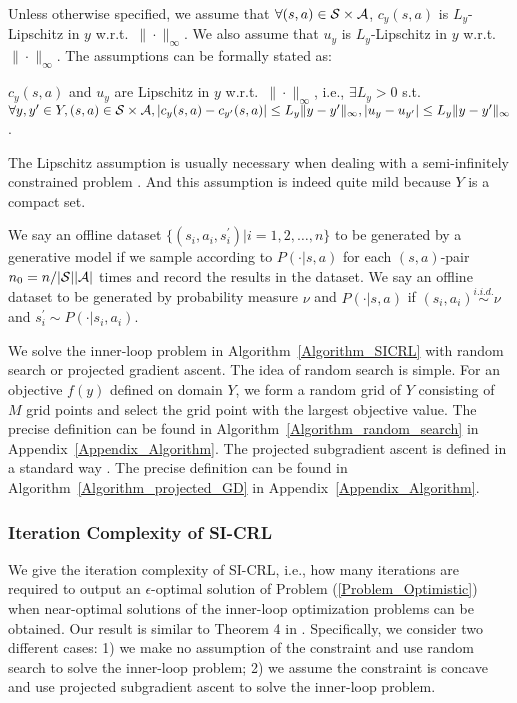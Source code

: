 Unless otherwise specified, we assume that $\forall (s,a)\in {\mathcal{S}}\times {\mathcal{A}}$, $c_y(s,a)$ is $L_y$-Lipschitz in $y$ w.r.t.\ $\|\cdot\|_\infty$.
We also assume that $u_y$ is $L_y$-Lipschitz in $y$ w.r.t.\ $\|\cdot\|_\infty$.
The assumptions can be formally stated as:
\begin{assumption}\label{Assumption_Lipschitz}
$c_y(s,a)$ and $u_y$ are Lipschitz in $y$ w.r.t.\ $\|\cdot\|_\infty$, i.e., $\exists L_y>0$ s.t. $\forall y,y^\prime\in Y, (s,a)\in {\mathcal{S}}\times {\mathcal{A}}, |c_y(s,a)-c_{y^\prime}(s,a)|\leq L_y\|y-y^\prime\|_\infty, 
|u_y-u_{y^\prime}|\leq L_y\|y-y^\prime\|_\infty$.
\end{assumption}
The Lipschitz assumption is usually necessary when dealing with a semi-infinitely constrained problem \citep{still2001discretization,Hu1990}.
And this assumption is indeed quite mild because $Y$ is a compact set.

We say an offline dataset $\{(s_i,a_i,s_i^\prime)|i=1, 2, \ldots, n\}$ to be generated by a generative model if we sample according to $P(\cdot|s,a)$ for each $(s,a)$-pair $n_0=n/|{\mathcal{S}}||{\mathcal{A}}|$ times and record the results in the dataset.
We say an offline dataset to be generated by probability measure $\nu$ and $P(\cdot|s,a)$ if $(s_i,a_i)\stackrel{i.i.d.}{\sim} \nu$ and $s_i^\prime\sim P(\cdot|s_i,a_i)$.

We solve the inner-loop problem in Algorithm~\ref{Algorithm_SICRL} with random search or projected gradient ascent.
The idea of random search is simple.
For an objective $f(y)$ defined on domain $Y$, we form a random grid of $Y$ consisting of $M$ grid points and select the grid point with the largest objective value.
The precise definition can be found in Algorithm~\ref{Algorithm_random_search} in Appendix~\ref{Appendix_Algorithm}.
The projected subgradient ascent is defined in a standard way \citep{bubeck2015convex}.
The precise definition can be found in Algorithm~\ref{Algorithm_projected_GD} in Appendix~\ref{Appendix_Algorithm}.

\subsubsection{Iteration Complexity of SI-CRL}

We give the iteration complexity of SI-CRL, i.e., how many iterations are required to output an $\epsilon$-optimal solution of Problem (\ref{Problem_Optimistic}) when near-optimal solutions of the inner-loop optimization problems can be obtained.
Our result is similar to Theorem 4 in \cite{Hu1990}.
Specifically, we consider two different cases: 1) we make no assumption of the constraint and use random search to solve the inner-loop problem; 2) we assume the constraint is concave and use projected subgradient ascent to solve the inner-loop problem.


